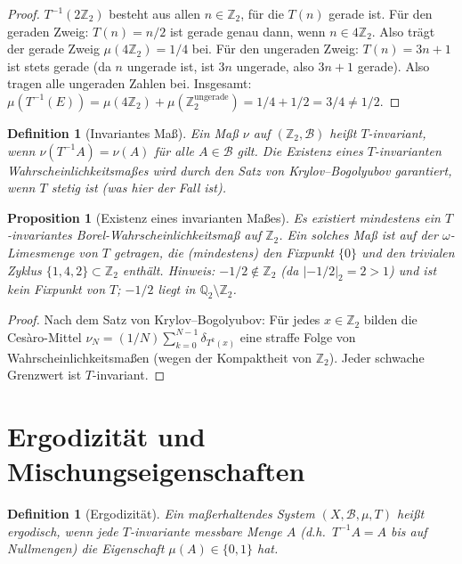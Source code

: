 \documentclass[12pt,a4paper]{article}
\newtheorem{proposition}[theorem]{Proposition}
\newtheorem{definition}[theorem]{Definition}
\begin{document}
\begin{proof}
$T^{-1}(2\mathbb{Z}_2)$ besteht aus allen $n \in \mathbb{Z}_2$, für die $T(n)$ gerade ist.
Für den geraden Zweig: $T(n) = n/2$ ist gerade genau dann, wenn $n \in 4\mathbb{Z}_2$.
Also trägt der gerade Zweig $\mu(4\mathbb{Z}_2) = 1/4$ bei.
Für den ungeraden Zweig: $T(n) = 3n+1$ ist stets gerade (da $n$ ungerade ist, ist $3n$
ungerade, also $3n+1$ gerade). Also tragen alle ungeraden Zahlen bei.
Insgesamt: $\mu(T^{-1}(E)) = \mu(4\mathbb{Z}_2) + \mu(\mathbb{Z}_2^{\text{ungerade}}) = 1/4 + 1/2 = 3/4 \neq 1/2$.
\end{proof}

\begin{definition}[Invariantes Maß]\label{def:invariant}
Ein Maß $\nu$ auf $(\mathbb{Z}_2, \mathcal{B})$ heißt \emph{$T$-invariant}, wenn
$\nu(T^{-1}A) = \nu(A)$ für alle $A \in \mathcal{B}$ gilt. Die Existenz eines
$T$-invarianten Wahrscheinlichkeitsmaßes wird durch den Satz von Krylov--Bogolyubov
garantiert, wenn $T$ stetig ist (was hier der Fall ist).
\end{definition}

\begin{proposition}[Existenz eines invarianten Maßes]\label{prop:exist_inv}
Es existiert mindestens ein $T$-invariantes Borel-Wahrscheinlichkeitsmaß auf $\mathbb{Z}_2$.
Ein solches Maß ist auf der $\omega$-Limesmenge von $T$ getragen, die (mindestens)
den Fixpunkt $\{0\}$ und den trivialen Zyklus $\{1, 4, 2\} \subset \mathbb{Z}_2$ enthält.
Hinweis: $-1/2 \notin \mathbb{Z}_2$ (da $|-1/2|_2 = 2 > 1$) und ist kein Fixpunkt von $T$;
$-1/2$ liegt in $\mathbb{Q}_2 \setminus \mathbb{Z}_2$.
\end{proposition}

\begin{proof}
Nach dem Satz von Krylov--Bogolyubov: Für jedes $x \in \mathbb{Z}_2$ bilden die
Cesàro-Mittel $\nu_N = (1/N)\sum_{k=0}^{N-1} \delta_{T^k(x)}$ eine straffe Folge von
Wahrscheinlichkeitsmaßen (wegen der Kompaktheit von $\mathbb{Z}_2$). Jeder schwache
Grenzwert ist $T$-invariant.
\end{proof}

\section{Ergodizität und Mischungseigenschaften}

\begin{definition}[Ergodizität]\label{def:ergodisch}
Ein maßerhaltendes System $(X, \mathcal{B}, \mu, T)$ heißt \emph{ergodisch}, wenn jede
$T$-invariante messbare Menge $A$ (d.h.\ $T^{-1}A = A$ bis auf Nullmengen) die Eigenschaft
$\mu(A) \in \{0, 1\}$ hat.
\end{definition}
\end{document}
